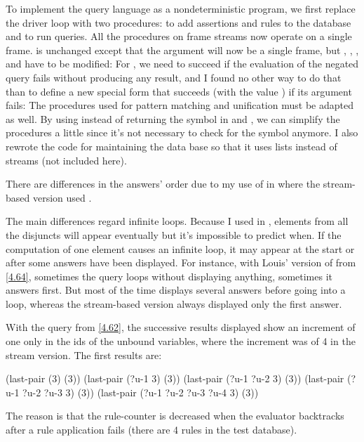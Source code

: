 \begin{exe}[4.78]
    To implement the query language as a nondeterministic program, we first 
    replace the driver loop with two procedures:  to add 
    assertions and rules to the database and  to run queries.
    All the procedures on frame streams now operate on a single frame. 
     is unchanged except that the  argument will 
    now be a single frame, but , , 
    ,  and  have to be modified:
    For , we need to succeed if the evaluation of the negated query 
    fails without producing any result, and I found no other way to do that than 
    to define a new special form  that succeeds (with the 
    value ) if its argument fails:
    The procedures used for pattern matching and unification must be adapted as 
    well. By using  instead of returning the  symbol in 
     and , we can simplify the procedures 
    a little since it’s not necessary to check for the  symbol 
    anymore.
    I also rewrote the code for maintaining the data base so that it uses lists 
    instead of streams (not included here).

    \medskip

    There are differences in the answers’ order due to my use of  in 
     where the stream-based version used 
    .

    The main differences regard infinite loops. Because I used  in 
    , elements from all the disjuncts will appear eventually but 
    it’s impossible to predict when. If the computation of one element causes 
    an infinite loop, it may appear at the start or after some answers have 
    been displayed. For instance, with Louis’ version of  
    from \autoref{4.64}, sometimes the query
     loops without displaying anything, 
    sometimes it answers first. But most of the time
     displays several answers before going into 
    a loop, whereas the stream-based version always displayed only the first 
    answer.

    With the query  from \autoref{4.62}, the successive 
    results displayed show an increment of one only in the ids of the unbound 
    variables, where the increment was of 4 in the stream version. The first 
    results are:
    \begin{cscm}
	(last-pair (3) (3))
	(last-pair (?u-1 3) (3))
	(last-pair (?u-1 ?u-2 3) (3))
	(last-pair (?u-1 ?u-2 ?u-3 3) (3))
	(last-pair (?u-1 ?u-2 ?u-3 ?u-4 3) (3))
    \end{cscm}
    The reason is that the rule-counter is decreased when the evaluator 
    backtracks after a rule application fails (there are 4 rules in the test 
    database).
\end{exe}
